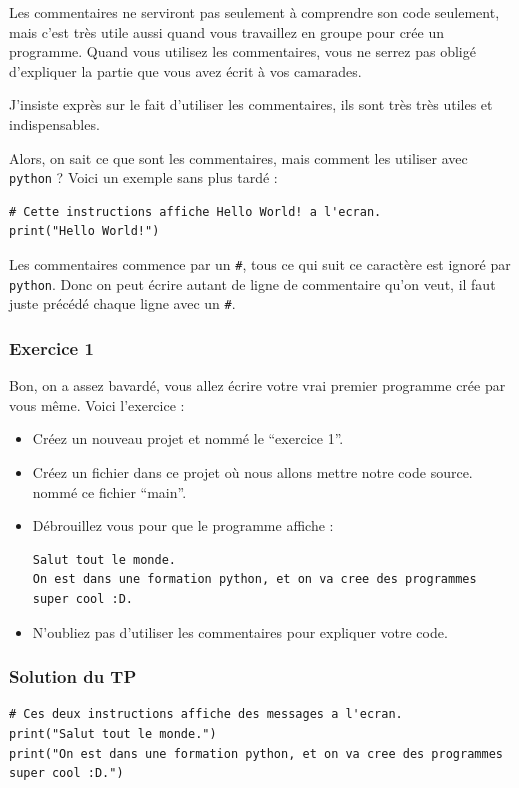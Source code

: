 \documentclass[12pt]{article}
\newcommand{\code}[1]{\colorbox{light-gray}{\texttt{#1}}}
\begin{document}
            Les commentaires ne serviront pas seulement à comprendre son code seulement, mais c'est très utile aussi
            quand vous travaillez en groupe pour crée un programme. Quand vous utilisez les commentaires, vous ne serrez
            pas obligé d'expliquer la partie que vous avez écrit à vos camarades.
            
            J'insiste exprès sur le fait d'utiliser les commentaires, ils sont très très utiles et indispensables.

            Alors, on sait ce que sont les commentaires, mais comment les utiliser avec \code{python} ? Voici 
            un exemple sans plus tardé :
            \begin{lstlisting}[style=code]
# Cette instructions affiche Hello World! a l'ecran.
print("Hello World!") 
            \end{lstlisting}

            Les commentaires commence par un \code{\#}, tous ce qui suit ce caractère est ignoré par \code{python}.
            Donc on peut écrire autant de ligne de commentaire qu'on veut, il faut juste précédé chaque ligne avec un
            \code{\#}.

        \subsubsection{Exercice 1}
            Bon, on a assez bavardé, vous allez écrire votre vrai premier programme crée par vous même.
            Voici l'exercice :
            \begin{itemize}
                \item Créez un nouveau projet et nommé le ``exercice 1''.
                \item Créez un fichier dans ce projet où nous allons mettre notre code source. nommé ce fichier
                    ``main''.
                \item Débrouillez vous pour que le programme affiche :
                    \begin{lstlisting}[style=exec_result, breaklines=false]
Salut tout le monde.
On est dans une formation python, et on va cree des programmes super cool :D.
                    \end{lstlisting}
                \item N'oubliez pas d'utiliser les commentaires pour expliquer votre code.
            \end{itemize}

        \subsubsection{Solution du TP}
            \begin{lstlisting}[style=code, breaklines=false]
# Ces deux instructions affiche des messages a l'ecran.
print("Salut tout le monde.")
print("On est dans une formation python, et on va cree des programmes super cool :D.")
            \end{lstlisting}
\end{document}
